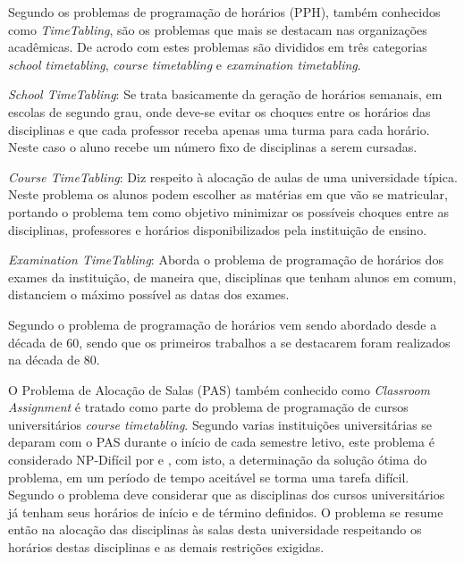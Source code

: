 

Segundo \cite{kripkasimulated} os problemas de programação de horários (PPH), também conhecidos como \textit{TimeTabling}, são os problemas que mais se destacam nas organizações acadêmicas. De acrodo com \cite{schaerf1999survey} estes problemas são divididos em três categorias \textit{school timetabling}, \textit{course timetabling} e \textit{examination timetabling}.\par

\textit{School TimeTabling}: Se trata basicamente da geração de horários semanais, em escolas de segundo grau, onde deve-se evitar os choques entre os horários das disciplinas e que cada professor receba apenas uma turma para cada horário. Neste caso o aluno recebe um número fixo de disciplinas a serem cursadas.\par

\textit{Course TimeTabling}: Diz respeito à alocação de aulas de uma universidade típica. Neste problema os alunos podem escolher as matérias em que vão se matricular, portando o problema tem como objetivo minimizar os possíveis choques entre as disciplinas, professores e horários disponibilizados pela instituição de ensino.\par

\textit{Examination TimeTabling}: Aborda o problema de programação de horários dos exames da instituição, de maneira que, disciplinas que tenham alunos em comum, distanciem o máximo possível as datas dos exames.\par

Segundo \cite{pinheiro2001ambiente} o problema de programação de horários vem sendo abordado desde a década de 60, sendo que os primeiros trabalhos a se destacarem foram realizados na década de 80.\par

O Problema de Alocação de Salas (PAS) também conhecido como \textit{Classroom Assignment} é tratado como parte do problema de programação de cursos universitários \textit{course timetabling}. Segundo \cite{marinho2005heuristicas} varias instituições universitárias se deparam com o PAS durante o início de cada semestre letivo, este problema é considerado NP-Difícil por \cite{even1975complexity} e \cite{carter1992classroom}, com isto, a determinação da solução ótima do problema, em um período de tempo aceitável se torma uma tarefa difícil. Segundo \cite{kripkasimulated} o problema deve considerar que as disciplinas dos cursos universitários já tenham seus horários de início e de término definidos. O problema se resume então na alocação das disciplinas às salas desta universidade respeitando os horários destas disciplinas e as demais restrições exigidas.\par

